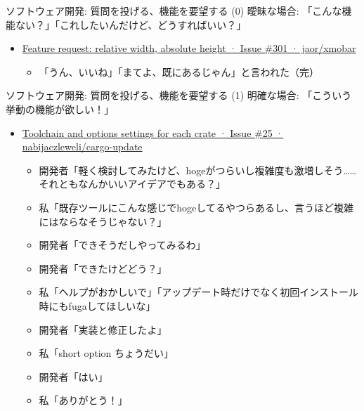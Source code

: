 \documentclass[
        unicode%
    ]{beamer}
\begin{document}
\begin{frame}{ソフトウェア開発: 質問を投げる、機能を要望する (0)}
    曖昧な場合: 「こんな機能ない？」「これしたいんだけど、どうすればいい？」

    \begin{itemize}
        \item \href{https://github.com/jaor/xmobar/issues/301}{Feature request: relative width, absolute height · Issue \#301 · jaor/xmobar}
            \begin{itemize}
                \item 「うん、いいね」「まてよ、既にあるじゃん」と言われた（完）
            \end{itemize}
    \end{itemize}
\end{frame}

\begin{frame}{ソフトウェア開発: 質問を投げる、機能を要望する (1)}
    明確な場合: 「こういう挙動の機能が欲しい！」

    \begin{itemize}
        \item \href{https://github.com/nabijaczleweli/cargo-update/issues/25}{Toolchain and options settings for each crate · Issue \#25 · nabijaczleweli/cargo-update}
            \begin{itemize}
                \pause
                \item 開発者「軽く検討してみたけど、hogeがつらいし複雑度も激増しそう……それともなんかいいアイデアでもある？」
                \pause
                \item 私「既存ツールにこんな感じでhogeしてるやつらあるし、言うほど複雑にはならなそうじゃない？」
                \pause
                \item 開発者「できそうだしやってみるわ」
                \pause
                \item 開発者「できたけどどう？」
                \pause
                \item 私「ヘルプがおかしいで」「アップデート時だけでなく初回インストール時にもfugaしてほしいな」
                \pause
                \item 開発者「実装と修正したよ」
                \pause
                \item 私「short option ちょうだい」
                \pause
                \item 開発者「はい」
                \item 私「ありがとう！」

            \end{itemize}
    \end{itemize}
\end{frame}
\end{document}
